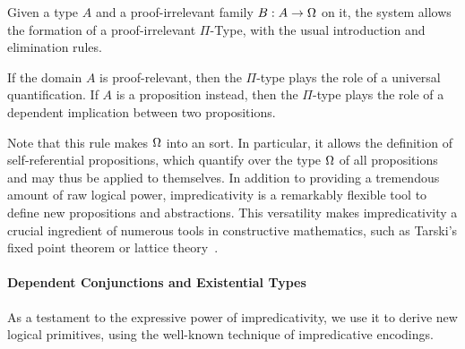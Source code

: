 Given a type \( A \) and a proof-irrelevant family \( B : A \to \Omega \)
on it, the system allows the formation of a proof-irrelevant \( \Pi \)-Type, 
with the usual introduction and elimination rules.
% 
% 
If the domain \( A \) is proof-relevant, then the \( \Pi \)-type plays 
the role of a universal quantification. If \( A \) is a proposition 
instead, then the \( \Pi \)-type plays the role of a dependent implication 
between two propositions.

Note that this rule makes \( \Omega \) into an 
sort.
% 
In particular, it allows the definition of self-referential propositions,
which quantify over the type \( \Omega \) of all propositions and may thus
be applied to themselves.
%
In addition to providing a tremendous amount of raw logical power, 
impredicativity is a remarkably flexible tool to define new propositions and
abstractions.
% 
This versatility makes impredicativity a crucial ingredient of numerous 
tools in constructive mathematics, such as Tarski's fixed point theorem or 
lattice theory~.

\paragraph*{Dependent Conjunctions and Existential Types}
% 
As a testament to the expressive power of impredicativity, we use it to 
derive new logical primitives, using the well-known technique of impredicative 
encodings.

